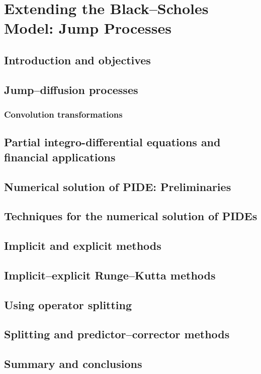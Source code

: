 \chapter{Extending the Black–Scholes Model: Jump Processes}

\section{Introduction and objectives}

\section{Jump–diffusion processes}

\subsection{Convolution transformations}

\section{Partial integro-differential equations and financial applications}

\section{Numerical solution of PIDE: Preliminaries}

\section{Techniques for the numerical solution of PIDEs}

\section{Implicit and explicit methods}

\section{Implicit–explicit Runge–Kutta methods}

\section{Using operator splitting}

\section{Splitting and predictor–corrector methods}

\section{Summary and conclusions}
